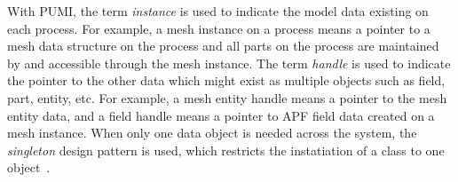 \documentclass[11pt]{article}  %
\begin{document}
%
%
%
%

With PUMI, the term \emph{instance} is used to indicate the model data existing on each process. For example, a mesh instance on a process means a pointer to a mesh data structure on the process and all parts on the process are maintained by and accessible through the mesh instance. The term \emph{handle} is used to indicate the pointer to the other data which might exist as multiple objects such as field, part, entity, etc. For example, a mesh entity handle means a pointer to the mesh entity data, and a field handle means a pointer to APF field data created on a mesh instance. When only one data object is needed across the system, the \emph{singleton} design pattern is used, which restricts the instatiation of a class to one object~\cite{designpattern}.
\end{document}
